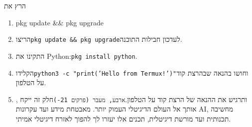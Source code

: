 \begin{tcbpractice}{הרץ את}
\begin{enumerate}
  \item pkg update \&\& pkg upgrade
  \item הריצו\texttt{pkg update \&\& pkg upgrade}לעדכון חבילות התוכנה.
  \item התקינו את Python:\texttt{pkg install python}.
  \item הקלידו\texttt{python3 -\allowbreak c "print('Hello from Termux!')"}וחושו בהנאה שבהרצת קוד על הטלפון.
  \item , ותרגיש את ההנאה של הרצת קוד על הטלפון.\texttt{ארבע, מעבר (פרקים 21-)}חלק זה ייקח אותך אל העולם הדיגיטלי העמוק יותר. מאבטחת מידע ועד עקרונות AI, מחשיבה תכנותית ועד מורשת דיגיטלית, תכנים אלו יעזרו לך להפוך לאזרח דיגיטלי אמיתי.
\end{enumerate}

\end{tcbpractice}
